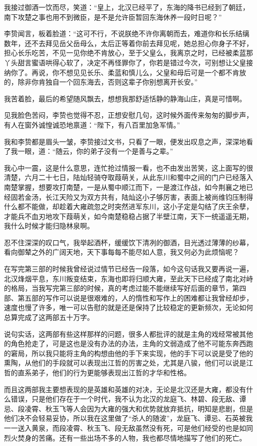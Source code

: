 我接过御酒一饮而尽，笑道：“皇上，北汉已经平了，东海的降书已经到了朝廷，南下攻楚之事也用不到微臣，是不是允许臣暂回东海休养一段时日呢？”

李贽闻言，板着脸道：“这可不行，不说朕绝不许你离朝而去，难道你和长乐结缡数年，还不去拜见岳父岳母么，太后正等着你前去拜见呢，她总担心你身子不好，担心长乐吃苦，不见一见你绝不肯放心，至于父皇么，我离京之时，已经被柔蓝那丫头甜言蜜语哄得心软了，决定不再怪罪你了，你若是错过今次，可别想让父皇接纳你了。再说，你不想见见长乐、柔蓝和慎儿么，父皇和母后可是一个都不肯放的，除非你肯独自一个回东海去，否则这辈子你别想离开长安。”

我苦着脸，最后的希望随风飘去，想想我那舒适恬静的静海山庄，真是可惜啊。

见我脸色苦闷，李贽也觉得不忍，正想安慰几句，这时候外面传来匆匆的脚步声，有人在窗外诚惶诚恐地禀道：“陛下，有八百里加急军情。”

我和李贽都是眉头一皱，李贽接过文书，只看了一眼，便发出叹息之声，深深地看了我一眼，道：“随云，你的弟子没有一个是善与之辈。”

我心中一震，这是什么意思，连忙抢过情报一看，也不由发出苦笑，这上面写的很清楚，六月二十七日，陆灿轻骑夺取葭萌关，从此东川和蜀中之间的门户已经落入南楚掌握，想要攻打南楚，一是从蜀中顺江而下，一是渡江作战，如今荆襄之地已经固若金汤，长江天险又为双方共有，陆灿这小子够厉害，表面上被尚维钧压制得什么都不能做，却趁着大雍疏忽之时突然进军东川，这小子定是勾结了庆王余孽，才能兵不血刃地攻下葭萌关，如今南楚稳稳占据了半壁江南，天下一统遥遥无期，我什么时候才能归隐林泉啊。

忍不住深深的叹口气，我举起酒杯，缓缓饮下清冽的御酒，目光透过薄薄的纱幕，看向御辇之外的广阔天地，天下事每每不能尽如人意，我又何必为此烦恼呢？

在写完第三部的时候我曾经说过情节已经告一段落，如今这句话我又要再说一遍，北汉烽烟平息，东川叛变结束，东海也即将归顺大雍，至此天下已经成了南北对峙的格局，当我写完第三部的时候，真的考虑过能不能继续写好后面的章节，第四部、第五部的写作可以说是很艰难的，人的惰性和写作上的困难都让我曾经却步，速度也慢了许多，唯一可以告慰的就是还是保持了比较稳定的更新频次，无论如何总算完成了这两部五十万字。

说句实话，这两部有些这样那样的问题，很多人都批评的就是主角的戏经常被其他的角色抢走了，可是这也是没有办法的办法，主角的文弱造成了他不可能东奔西跑的窘局，所以我只能将主角的构想由他的手下来实现，他的手下可以说是受了他的熏陶，从他们的手段就可以表现出江哲的厉害之处，尤其是八骏，他们可以说是江哲的直系弟子，他们的行为更能够表现出江哲的才华和性格。

而且这两部我主要想表现的是英雄和英雄的对决，无论是北汉还是大雍，都没有什么错误，只是他们存在于一个时代，我不认为北汉的龙庭飞、林碧、段无敌、谭忌、段凌霄、秋玉飞等人会因为大雍的强大和优势就放弃抵抗，明知是悲剧，但是他们决不会轻易妥协，所以我在这里做了“杀人的随波”，龙庭飞、谭忌、石英被我一一送入黄泉，而段凌霄、秋玉飞、段无敌虽然没有死，可是他们经受的也是如同烈火焚身的苦痛。还有一些出场不多的人物，我也都尽情地描写了他们的死亡。

